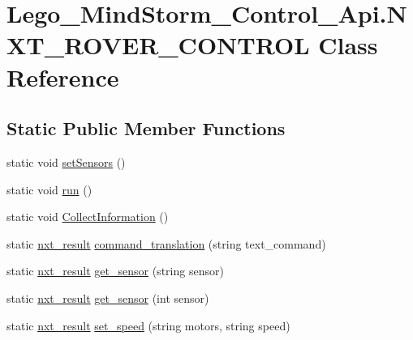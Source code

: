 \hypertarget{class_lego___mind_storm___control___api_1_1_n_x_t___r_o_v_e_r___c_o_n_t_r_o_l}{
\section{Lego\_\-MindStorm\_\-Control\_\-Api.NXT\_\-ROVER\_\-CONTROL Class Reference}
\label{class_lego___mind_storm___control___api_1_1_n_x_t___r_o_v_e_r___c_o_n_t_r_o_l}
}
\subsection*{Static Public Member Functions}
\begin{CompactItemize}
\item 
static void \hyperlink{class_lego___mind_storm___control___api_1_1_n_x_t___r_o_v_e_r___c_o_n_t_r_o_l_ca629fd05b17b54a9881893caece96b4}{setSensors} ()
\item 
static void \hyperlink{class_lego___mind_storm___control___api_1_1_n_x_t___r_o_v_e_r___c_o_n_t_r_o_l_d10fd0ad39b0b68b188b846a6fe713f3}{run} ()
\item 
static void \hyperlink{class_lego___mind_storm___control___api_1_1_n_x_t___r_o_v_e_r___c_o_n_t_r_o_l_85a22d5ba990c5486bac8dc13da5d7c0}{CollectInformation} ()
\item 
static \hyperlink{class_lego___mind_storm___control___api_1_1nxt__result}{nxt\_\-result} \hyperlink{class_lego___mind_storm___control___api_1_1_n_x_t___r_o_v_e_r___c_o_n_t_r_o_l_c343c6e5c1b03ad7632bccc27f25cd92}{command\_\-translation} (string text\_\-command)
\item 
static \hyperlink{class_lego___mind_storm___control___api_1_1nxt__result}{nxt\_\-result} \hyperlink{class_lego___mind_storm___control___api_1_1_n_x_t___r_o_v_e_r___c_o_n_t_r_o_l_1ae3347fa7e0359c7ff85335f6853d9a}{get\_\-sensor} (string sensor)
\item 
static \hyperlink{class_lego___mind_storm___control___api_1_1nxt__result}{nxt\_\-result} \hyperlink{class_lego___mind_storm___control___api_1_1_n_x_t___r_o_v_e_r___c_o_n_t_r_o_l_fc928f9206e441cd6ff3c7721a002dd7}{get\_\-sensor} (int sensor)
\item 
static \hyperlink{class_lego___mind_storm___control___api_1_1nxt__result}{nxt\_\-result} \hyperlink{class_lego___mind_storm___control___api_1_1_n_x_t___r_o_v_e_r___c_o_n_t_r_o_l_9bfbb189dc1f7507bc9caadfeb5d6ab4}{set\_\-speed} (string motors, string speed)

\end{CompactItemize}

